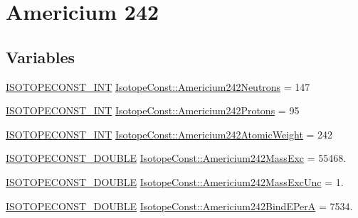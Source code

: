 \hypertarget{group___isotope_const-_americium-_am242}{}\section{Americium 242}
\label{group___isotope_const-_americium-_am242}
\subsection*{Variables}
\begin{DoxyCompactItemize}
\item 
\mbox{\hyperlink{group___isotope_const-_macros_ga5f18360b3e99483a35c32d789e62621c}{I\+S\+O\+T\+O\+P\+E\+C\+O\+N\+S\+T\+\_\+\+I\+NT}} \mbox{\hyperlink{group___isotope_const-_americium-_am242_gafa84d48a21481365eab0c6b12430a343}{Isotope\+Const\+::\+Americium242\+Neutrons}} = 147
\item 
\mbox{\hyperlink{group___isotope_const-_macros_ga5f18360b3e99483a35c32d789e62621c}{I\+S\+O\+T\+O\+P\+E\+C\+O\+N\+S\+T\+\_\+\+I\+NT}} \mbox{\hyperlink{group___isotope_const-_americium-_am242_ga6311dde1e6b32dafcdfbbeef4a5de60e}{Isotope\+Const\+::\+Americium242\+Protons}} = 95
\item 
\mbox{\hyperlink{group___isotope_const-_macros_ga5f18360b3e99483a35c32d789e62621c}{I\+S\+O\+T\+O\+P\+E\+C\+O\+N\+S\+T\+\_\+\+I\+NT}} \mbox{\hyperlink{group___isotope_const-_americium-_am242_ga91e134c90a17a3ead9026873a297351f}{Isotope\+Const\+::\+Americium242\+Atomic\+Weight}} = 242
\item 
\mbox{\hyperlink{group___isotope_const-_macros_ga8f45a7272ce02c0b4c65c44636ed719a}{I\+S\+O\+T\+O\+P\+E\+C\+O\+N\+S\+T\+\_\+\+D\+O\+U\+B\+LE}} \mbox{\hyperlink{group___isotope_const-_americium-_am242_ga9697128af6708a13d7454e02e7813b61}{Isotope\+Const\+::\+Americium242\+Mass\+Exc}} = 55468.
\item 
\mbox{\hyperlink{group___isotope_const-_macros_ga8f45a7272ce02c0b4c65c44636ed719a}{I\+S\+O\+T\+O\+P\+E\+C\+O\+N\+S\+T\+\_\+\+D\+O\+U\+B\+LE}} \mbox{\hyperlink{group___isotope_const-_americium-_am242_gaa59b28033fc93fdb1d6a11ebe84d2ce1}{Isotope\+Const\+::\+Americium242\+Mass\+Exc\+Unc}} = 1.
\item 
\mbox{\hyperlink{group___isotope_const-_macros_ga8f45a7272ce02c0b4c65c44636ed719a}{I\+S\+O\+T\+O\+P\+E\+C\+O\+N\+S\+T\+\_\+\+D\+O\+U\+B\+LE}} \mbox{\hyperlink{group___isotope_const-_americium-_am242_ga4279841df6dad39da2d7aa339e27c7ee}{Isotope\+Const\+::\+Americium242\+Bind\+E\+PerA}} = 7534.
\item 

\end{DoxyCompactItemize}
